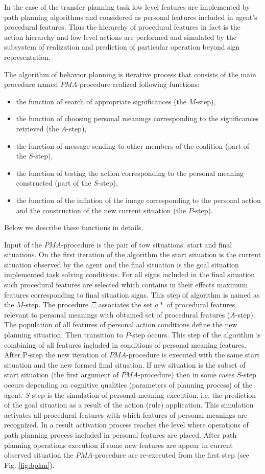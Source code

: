 \documentclass[runningheads,a4paper]{llncs}
\begin{document}
In the case of the transfer planning task low level features are implemented by path planning algorithms and considered as personal features included in agent's procedural features. Thus the hierarchy of procedural features in fact is the action hierarchy and low level actions are performed and simulated by the subsystem of realization and prediction of particular operation beyond sign representation.

The algorithm of behavior planning is iterative process that consists of the main procedure named $PMA$-procedure realized following functions:
\begin{itemize}
	\item the function of search of appropriate significances (the $M$-step), 
	\item the function of choosing personal meanings corresponding to the significances retrieved (the $A$-step), 
	\item the function of message sending to other members of the coalition (part of the $S$-step),
	\item the function of testing the action corresponding to the personal meaning constructed (part of the $S$-step),
	\item the function of the inflation of the image corresponding to the personal action and the construction of the new current situation (the $P$-step).
\end{itemize}
Below we describe these functions in details.

Input of the $PMA$-procedure is the pair of tow situations: start and final situations. On the first iteration of the algorithm the start situation is the current situation observed by the agent and the final situation is the goal situation implemented task solving conditions. For all signs included in the final situation such procedural features are selected which contains in their effects maximum features corresponding to final situation signs. This step of algorithm is named as the $M$-step. The procedure $\Xi$ associates the set $a*$ of procedural features relevant to personal meanings with obtained set of procedural features ($A$-step). The population of all features of personal action conditions define the new planning situation. Then transition to $P$-step occurs. This step of the algorithm is combining of all features included in conditions of personal meaning features. After P-step the new iteration of $PMA$-procedure is executed with the same start situation and the new formed final situation. If new situation is the subset of start situation (the first argument of $PMA$-procedure) then in some cases $S$-step occurs depending on cognitive qualities (parameters of planning process) of the agent. $S$-step is the simulation of personal meaning execution, i.e. the prediction of the goal situation as a result of the action (rule) application. This simulation activates all procedural features with which features of personal meanings are recognized. In a result activation process reaches the level where operations of path planning process included in personal features are placed. After path planning operations execution if some new features are appear in current observed situation the $PMA$-procedure are re-executed from the first step (see Fig. \ref{fig:bplan}).
\end{document}
